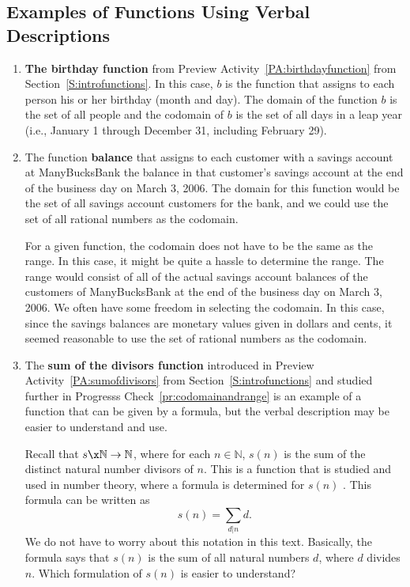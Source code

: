 \subsection*{Examples of Functions Using Verbal Descriptions}
\begin{enumerate}
\item \textbf{The birthday function}
%
 from Preview Activity~\ref{PA:birthdayfunction}  from Section~\ref{S:introfunctions}.  
In this case,   $b$   is the function that assigns to each person his or her birthday (month and day).  The domain of the function  $b$  is the set of all people and the codomain of  $b$  is the set of all days in a leap year (i.e., January 1 through December 31, including February 29).

\item The function  \textbf{balance}  that assigns to each customer with a savings account at ManyBucksBank  the balance in that customer's savings account at the end of the business day on March 3, 2006.  The domain for this function would be the set of all savings account customers for the bank, and we could use the set of all rational numbers as the codomain.

\note  For a given function, the codomain does not have to be the same as the range.  In this case, it might be quite a hassle to determine the range.  The range would consist of all of the actual savings account balances of the customers of ManyBucksBank at the end of the business day on March 3, 2006.   We often have some freedom in selecting the codomain.  In this case, since the savings balances are monetary values given in dollars and cents, it seemed reasonable to use the set of rational numbers as the codomain.

\item The \textbf{sum of the divisors function}
%
 introduced in Preview Activity~\ref{PA:sumofdivisors} from Section~\ref{S:introfunctions} and studied further in Progresss Check~\ref{pr:codomainandrange} is an example of a function that can be given by a formula, but the verbal description may be easier to understand and use.  

Recall that  $s\x \mathbb{N} \to \mathbb{N}$,  where for each  $n \in \mathbb{N}$,  
$s( n )$ is the sum of the distinct natural number divisors of  $n$.  This is a function that is studied and used in number theory, where a formula is determined for  $s\left( n \right)$
.  This formula can be written as
\[
s( n ) = \sum\limits_{d\left| n \right.} d .
\]
We do not have to worry about this notation in this text.  Basically, the formula says that  
$s( n )$ is the sum of all natural numbers  $d$,  where  $d$  divides  $n$.  Which formulation of  $s( n )$  is easier to understand?
\end{enumerate}
\hbreak
%

